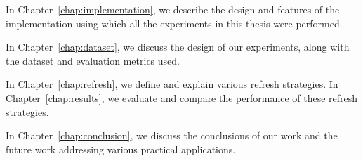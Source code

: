 In Chapter~\ref{chap:implementation}, we describe the design and features of
the implementation using which all the experiments in this thesis were
performed.

In Chapter~\ref{chap:dataset}, we discuss the design of our experiments, along
with the dataset and evaluation metrics used.

In Chapter~\ref{chap:refresh}, we define and explain various refresh strategies.  In
Chapter~\ref{chap:results}, we evaluate and compare the performance of these
refresh strategies.

In Chapter~\ref{chap:conclusion}, we discuss the conclusions of our work
and the future work addressing various practical applications.
